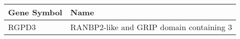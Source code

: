 \begin{tabular}{ll}
\toprule
Gene Symbol &                                     Name \\
\midrule
      RGPD3 & RANBP2-like and GRIP domain containing 3 \\
\bottomrule
\end{tabular}
